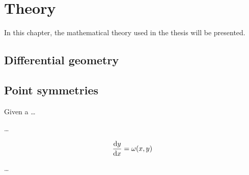 \chapter{Theory}

In this chapter, the mathematical theory used in the thesis will be presented.

\section{Differential geometry}

\section{Point symmetries}

Given a \dots

\dots

\begin{equation} \label{eq:first-order-ode}
  \dv{y}{x} = \omega(x,y)
\end{equation}

\dots

